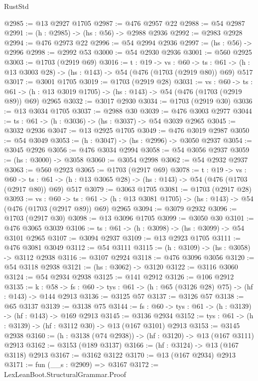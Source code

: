 \begin{lexlean}{RustStd}
\begin{coremodule}
@2985 := @13 @2927 @1705
@2987 := @476 @2957 @22
@2988 := @54 @2987
@2991 := (h : @2985) -> (hs : @56) -> @2988 @2936
@2992 := @2983 @2928
@2994 := @476 @2973 @22
@2996 := @54 @2994 @2936
@2997 := (hs : @56) -> @2996
@2998 := @2992 @53
@3000 := @54 @2930 @2936
@3001 := @560 @2925
@3003 := @1703 (@2919 @69)
@3016 := {t : @19} ->
  {vs : @60} ->
  {ts : @61} -> (h : @13 @3003 @28) -> (hs : @143) -> @54 (@476 (@1703 (@2919 @80)) @69) @517
@3017 := @3001 @1705
@3019 := @1703 (@2919 @28)
@3031 := {vs : @60} ->
  {ts : @61} -> (h : @13 @3019 @1705) -> (hs : @143) -> @54 (@476 (@1703 (@2919 @89)) @69) @2965
@3032 := @3017 @2930
@3034 := @1703 (@2919 @30)
@3036 := @13 @3034 @1705
@3037 := @2988 @30
@3039 := @476 @3003 @2977
@3044 := {ts : @61} -> (h : @3036) -> (hs : @3037) -> @54 @3039 @2965
@3045 := @3032 @2936
@3047 := @13 @2925 @1705
@3049 := @476 @3019 @2987
@3050 := @54 @3049
@3053 := (h : @3047) -> (hs : @2996) -> @3050 @2937
@3054 := @3045 @2926
@3056 := @476 @3034 @2994
@3058 := @54 @3056 @2937
@3059 := (hs : @3000) -> @3058
@3060 := @3054 @2998
@3062 := @54 @2932 @2937
@3063 := @560 @2923
@3065 := @1703 (@2917 @69)
@3078 := {t : @19} ->
  {vs : @60} ->
  {ts : @61} -> (h : @13 @3065 @28) -> (hs : @143) -> @54 (@476 (@1703 (@2917 @80)) @69) @517
@3079 := @3063 @1705
@3081 := @1703 (@2917 @28)
@3093 := {vs : @60} ->
  {ts : @61} -> (h : @13 @3081 @1705) -> (hs : @143) -> @54 (@476 (@1703 (@2917 @89)) @69) @2965
@3094 := @3079 @2932
@3096 := @1703 (@2917 @30)
@3098 := @13 @3096 @1705
@3099 := @3050 @30
@3101 := @476 @3065 @3039
@3106 := {ts : @61} -> (h : @3098) -> (hs : @3099) -> @54 @3101 @2965
@3107 := @3094 @2937
@3109 := @13 @2923 @1705
@3111 := @476 @3081 @3049
@3112 := @54 @3111
@3115 := (h : @3109) -> (hs : @3058) -> @3112 @2938
@3116 := @3107 @2924
@3118 := @476 @3096 @3056
@3120 := @54 @3118 @2938
@3121 := (hs : @3062) -> @3120
@3122 := @3116 @3060
@3124 := @54 @2934 @2938
@3125 := @141 @2912
@3126 := @106 @2912
@3135 := {k : @58} ->
  {fs : @60} -> {tys : @61} -> (h : @65 (@3126 @28) @75) -> (hf : @143) -> @144 @2913
@3136 := @3125 @57
@3137 := @3126 @57
@3138 := @65 @3137
@3139 := @3138 @75
@3144 := {fs : @60} -> {tys : @61} -> (h : @3139) -> (hf : @143) -> @169 @2913
@3145 := @3136 @2934
@3152 := {tys : @61} -> (h : @3139) -> (hf : @3112 @30) -> @13 (@167 @3101) @2913
@3153 := @3145 @2938
@3160 := (h : @3138 (@74 @2938)) -> (hf : @3120) -> @13 (@167 @3111) @2913
@3162 := @3153 (@189 @3137)
@3166 := (hf : @3124) -> @13 (@167 @3118) @2913
@3167 := @3162 @3122
@3170 := @13 (@167 @2934) @2913
@3171 := fun (__s : @2909) => @3167
@3172 := LexLeanBoot.StructuralGrammar.Proof

\end{coremodule}
\end{lexlean}
